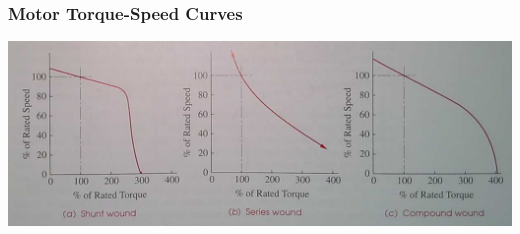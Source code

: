 \documentclass[fleqn]{beamer} %
\newcommand{\sectiontitleIII}{Motor Torque-Speed Curves}
\begin{document}
	\begin{frame}[label=sectionIII] \small
		\frametitle{\sectiontitleIII}
	 		

		\includegraphics[scale=.25]{images/torque_speed_various.png}

	        
		\end{frame}  
\end{document}
